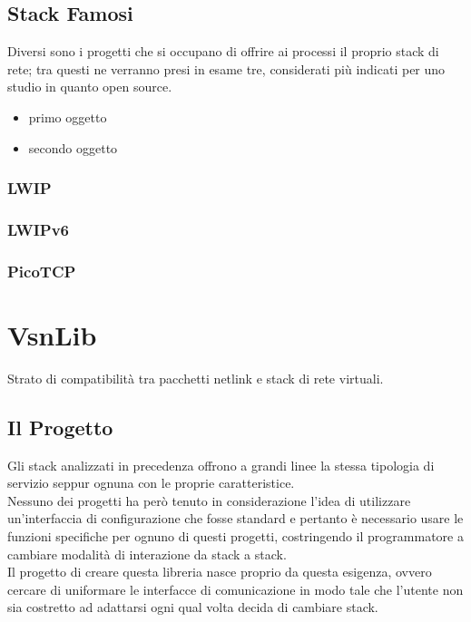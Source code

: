 \documentclass[14pt,a4paper,openright,twoside]{extreport}
\begin{document}
\section{Stack Famosi}
Diversi sono i progetti che si occupano di offrire ai processi il proprio stack di rete; tra questi ne verranno presi in esame tre, considerati pi\`u indicati per uno studio in quanto open source.
\begin{itemize}                         %
\item primo oggetto
\item secondo oggetto
\end{itemize}
\subsection{LWIP}
\subsection{LWIPv6}
\subsection{PicoTCP}

\clearpage{\pagestyle{empty}\cleardoublepage}

\chapter{VsnLib}                %
\lhead[\fancyplain{}{\bfseries\thepage}]{\fancyplain{}{\bfseries\rightmark}}
Strato di compatibilità tra pacchetti netlink e stack di rete virtuali.

\section{Il Progetto}                 %
Gli stack analizzati in precedenza offrono a grandi linee la stessa tipologia di servizio seppur ognuna con le proprie caratteristice.\\
Nessuno dei progetti ha per\`o tenuto in considerazione l'idea di utilizzare un'interfaccia di configurazione che fosse standard e pertanto \`e necessario usare le funzioni specifiche per ognuno di questi progetti, costringendo il programmatore a cambiare modalit\`a di interazione da stack a stack.\\
Il progetto di creare questa libreria nasce proprio da questa esigenza, ovvero cercare di uniformare le interfacce di comunicazione in modo tale che l'utente non sia costretto ad adattarsi ogni qual volta decida di cambiare stack.\\
\end{document}
